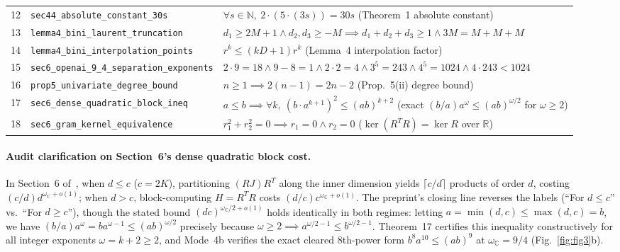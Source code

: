 \documentclass[10pt,twocolumn]{article}
\begin{document}
\begin{table}[t]
\begin{tabular}{@{}cll@{}}
12 & \texttt{sec44\_absolute\_constant\_30s} & $\forall s\in\mathbb{N},\ 2\cdot(5\cdot(3s)) = 30s$ (Theorem~1 absolute constant) \\
13 & \texttt{lemma4\_bini\_laurent\_truncation} & $d_1\ge 2M+1 \wedge d_2,d_3\ge -M \implies d_1+d_2+d_3 \ge 1 \wedge 3M = M+M+M$ \\
14 & \texttt{lemma4\_bini\_interpolation\_points} & $r^k \le (kD+1)r^k$ (Lemma~4 interpolation factor) \\
15 & \texttt{sec6\_openai\_9\_4\_separation\_exponents} & $2\cdot 9=18 \wedge 9-8=1 \wedge 2\cdot 2=4 \wedge 3^5=243 \wedge 4^5=1024 \wedge 4\cdot 243 < 1024$ \\
16 & \texttt{prop5\_univariate\_degree\_bound} & $n\ge 1 \implies 2(n-1) = 2n-2$ (Prop.~5(ii) degree bound) \\
17 & \texttt{sec6\_dense\_quadratic\_block\_ineq} & $a\le b \implies \forall k,\ (b\cdot a^{k+1})^2 \le (ab)^{k+2}$ (exact $(b/a)a^\omega \le (ab)^{\omega/2}$ for $\omega\ge 2$) \\
18 & \texttt{sec6\_gram\_kernel\_equivalence} & $r_1^2 + r_2^2 = 0 \implies r_1=0 \wedge r_2=0$ ($\ker(R^TR)=\ker R$ over $\mathbb{R}$) \\
\bottomrule
\end{tabular}
\end{table}

\paragraph{Audit clarification on Section~6's dense quadratic block cost.}
In Section~6 of~\cite{Chen2026DetVerif}, when $d \le c$ ($c=2K$), partitioning $(RJ)R^T$ along the inner dimension yields $\lceil c/d \rceil$ products of order $d$, costing $(c/d)d^{\omega_{\mathbb{C}}+o(1)}$; when $d > c$, block-computing $H=R^TR$ costs $(d/c)c^{\omega_{\mathbb{C}}+o(1)}$. The preprint's closing line reverses the labels (``For $d \le c$'' vs.\ ``For $d \ge c$''), though the stated bound $(dc)^{\omega_{\mathbb{C}}/2+o(1)}$ holds identically in both regimes: letting $a = \min(d,c) \le \max(d,c) = b$, we have $(b/a)a^\omega = b a^{\omega-1} \le (ab)^{\omega/2}$ precisely because $\omega \ge 2 \implies a^{\omega/2-1} \le b^{\omega/2-1}$. Theorem~17 certifies this inequality constructively for all integer exponents $\omega = k+2 \ge 2$, and Mode~4b verifies the exact cleared 8th-power form $b^8 a^{10} \le (ab)^9$ at $\omega_{\mathbb{C}} = 9/4$ (Fig.~\ref{fig:fig3}b).
\end{document}
